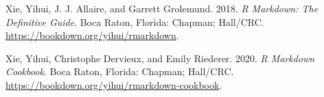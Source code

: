 \documentclass[
  lang=cn,
  11pt,
  scheme=chinese,
  chinesefont=nofont,
  citestyle=gb7714-2015,
  bibstyle=gb7714-2015]{elegantbook}
\newlength{\cslhangindent}
\newlength{\cslentryspacingunit} %
\newenvironment{CSLReferences}[2] %
 {%
  \setlength{\parindent}{0pt}
  \ifodd #1
  \let\oldpar\par
  \def\par{\hangindent=\cslhangindent\oldpar}
  \fi
  \setlength{\parskip}{#2\cslentryspacingunit}
 }%
 {}
\begin{document}
\begin{CSLReferences}{1}{0}
\leavevmode{}%
Xie, Yihui, J. J. Allaire, and Garrett Grolemund. 2018. \emph{R Markdown: The Definitive Guide}. Boca Raton, Florida: Chapman; Hall/CRC. \url{https://bookdown.org/yihui/rmarkdown}.

\leavevmode{}%
Xie, Yihui, Christophe Dervieux, and Emily Riederer. 2020. \emph{R Markdown Cookbook}. Boca Raton, Florida: Chapman; Hall/CRC. \url{https://bookdown.org/yihui/rmarkdown-cookbook}.

\end{CSLReferences}
\end{document}

